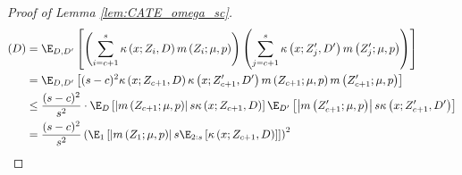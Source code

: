 \begin{proof}[Proof of Lemma \ref{lem:CATE_omega_sc}]
\begin{equation}
	\end{equation}
	\begin{equation}
		\begin{aligned}
			(D)
			& = \E_{D, D^{\prime}}\left[\left(\sum_{i = c + 1}^{s} \kappa\left(x; Z_{i}, D\right) m\left(Z_{i}; \mu, p\right)\right)
            \left(\sum_{j = c + 1}^{s} \kappa\left(x; Z_{j}^{\prime}, D^{\prime}\right) m\left(Z_{j}^{\prime}; \mu, p\right)\right)\right] \\
			& = \E_{D, D^{\prime}}\left[(s-c)^2 \kappa\left(x; Z_{c+1}, D\right)\kappa\left(x; Z_{c+1}^{\prime}, D^{\prime}\right)
			 m\left(Z_{c+1}; \mu, p\right)  m\left(Z_{c+1}^{\prime}; \mu, p\right)\right] \\
			 & \leq \frac{(s-c)^2}{s^2} \cdot \E_{D}\left[\left|m\left(Z_{c+1}; \mu, p\right)\right| s \kappa\left(x; Z_{c+1}, D\right)\right]
			 \E_{D^{\prime}}\left[\left|m\left(Z_{c+1}^{\prime}; \mu, p\right)\right| s \kappa\left(x; Z_{c+1}^{\prime}, D^{\prime}\right) \right]\\
			 & = \frac{(s-c)^2}{s^2} \left(\E_{1}\left[\left|m\left(Z_{1}; \mu, p\right)\right| s \E_{2:s}\left[\kappa\left(x; Z_{c+1}, D\right)\right]\right]\right)^2
		\end{aligned}
	\end{equation}
\end{proof}
